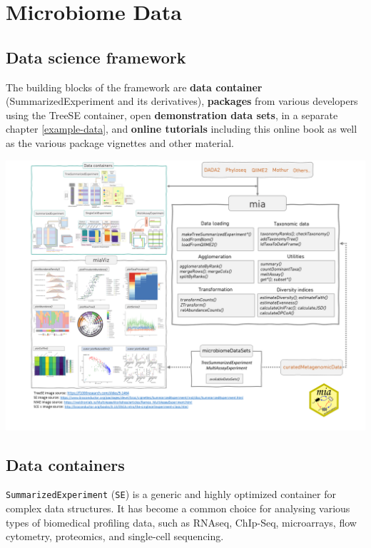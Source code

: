 \documentclass[
]{book}
\begin{document}
\hypertarget{containers}{%
\chapter{Microbiome Data}\label{containers}}

\hypertarget{data-science-framework}{%
\section{Data science framework}\label{data-science-framework}}

The building blocks of the framework are \textbf{data container}
(SummarizedExperiment and its derivatives), \textbf{packages} from various
developers using the TreeSE container, open \textbf{demonstration data
sets}, in a separate chapter \ref{example-data}, and \textbf{online
tutorials} including this online book as well as the various package
vignettes and other material.

\includegraphics[width=18.67in]{general/figures/FigureOverviewV2_mod}

\hypertarget{data-containers}{%
\section{Data containers}\label{data-containers}}

\texttt{SummarizedExperiment} (\texttt{SE}) \citep{R-SummarizedExperiment} is a generic and highly optimized container for complex data
structures. It has become a common choice for analysing various types
of biomedical profiling data, such as RNAseq, ChIp-Seq, microarrays,
flow cytometry, proteomics, and single-cell
sequencing.
\end{document}
